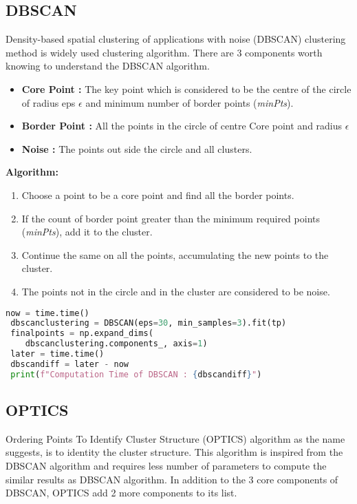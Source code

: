 \subsection{DBSCAN}
 Density-based spatial clustering of applications with noise (DBSCAN) clustering method is widely used clustering algorithm. There are 3 components worth knowing to understand the DBSCAN algorithm.
 
 \begin{itemize}
	\item \textbf{Core Point :}  The key point which is considered to be the centre of the circle of radius eps $\epsilon$ and minimum number of border points (\emph{minPts}).
	\item \textbf{Border Point :} All the points in the circle of centre Core point and radius $\epsilon$
	\item \textbf{Noise :} The points out side the circle and all clusters.
\end{itemize}

\textbf{Algorithm:}
 \begin{enumerate}
	\item Choose a point to be a core point and find all the border points.
	\item If the count of border point greater than the minimum required points (\emph{minPts}), add it to the cluster.
	\item Continue the same on all the points, accumulating the new points to the cluster.
	\item The points not in the circle and in the cluster are considered to be noise.
\end{enumerate}
 
 \begin{lstlisting}[language=Python, frame=single, caption=Python code to compute DBSCAN algorithm]
 now = time.time()
 dbscanclustering = DBSCAN(eps=30, min_samples=3).fit(tp)
 finalpoints = np.expand_dims(
 	dbscanclustering.components_, axis=1)
 later = time.time()
 dbscandiff = later - now
 print(f"Computation Time of DBSCAN : {dbscandiff}")
\end{lstlisting}
 
\subsection{OPTICS}
Ordering Points To Identify Cluster Structure (OPTICS) algorithm as the name suggests, is to identity the cluster structure. This algorithm is inspired from the DBSCAN algorithm and requires less number of parameters to compute the similar results as DBSCAN algorithm. In addition to the 3 core components of DBSCAN, OPTICS add 2 more components to its list.

